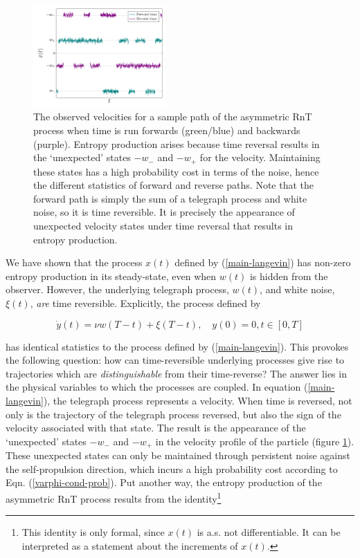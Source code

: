 \begin{figure}
    \centering
    \includegraphics[width = 0.45\textwidth]{figures/unexpected_state.pdf}
    \caption{\footnotesize The observed velocities for a sample path of the asymmetric RnT process when time is run forwards (green/blue) and backwards (purple). Entropy production arises because time reversal results in the `unexpected' states $-w_-$ and $-w_+$ for the velocity. Maintaining these states has a high probability cost in terms of the noise, hence the different statistics of forward and reverse paths. Note that the forward path is simply the sum of a telegraph process and white noise, so it is time reversible. It is precisely the appearance of unexpected velocity states under time reversal that results in entropy production.} 
   \label{unexpeced_states}
\end{figure}

We have shown that the process $x(t)$ defined by (\ref{main-langevin}) has non-zero entropy production in its steady-state, even when $w(t)$ is hidden from the observer. However, the underlying telegraph process, $w(t)$, and white noise, $\xi(t)$, \textit{are} time reversible. Explicitly, the process defined by

\begin{equation}
\dot{y}(t) = \nu w(T-t) + \xi(T-t), \quad y(0) = 0, t \in [0, T]
\end{equation}

 has identical statistics to the process defined by (\ref{main-langevin}).  This provokes the following question: how can time-reversible underlying processes give rise to trajectories which are \textit{distinguishable} from their time-reverse? 
 The answer lies in the physical variables to which the processes are coupled. In equation (\ref{main-langevin}), the telegraph process represents a velocity. When time is reversed, not only is the trajectory of the telegraph process reversed, but also the sign of the velocity associated with that state. The result is the appearance of the `unexpected' states $-w_-$ and $-w_+$ in the velocity profile of the particle (figure \ref{unexpeced_states}). These unexpected states can only be maintained through persistent noise against the self-propulsion direction, which incurs a high probability cost according to Eqn. (\ref{varphi-cond-prob}). Put another way, the entropy production of the asymmetric RnT process results from the identity\footnote{This identity is only formal, since $x(t)$ is a.s. not differentiable. It can be interpreted as a statement about the increments of $x(t)$.}


